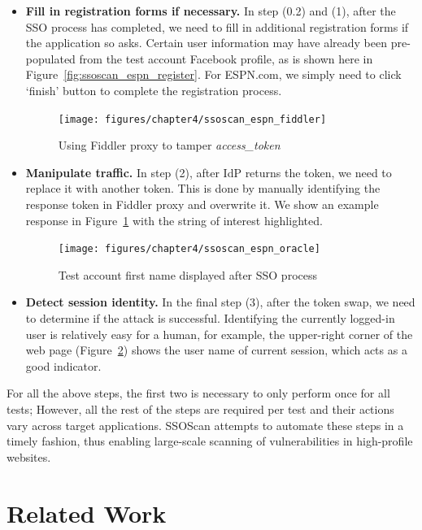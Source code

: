 \begin{itemize}
\item \textbf{Fill in registration forms if necessary.}  In step (0.2) and (1), after the SSO process has completed, we need to fill in additional registration forms if the application so asks.  Certain user information may have already been pre-populated from the test account Facebook profile, as is shown here in Figure~\ref{fig:ssoscan_espn_register}.  For ESPN.com, we simply need to click `finish' button to complete the registration process.

\begin{figure}[bht]
\centering
\texttt{[image: figures/chapter4/ssoscan\_espn\_fiddler]}
\caption{Using Fiddler proxy to tamper \emph{access\_token}}
\label{fig:ssoscan_espn_fiddler}
\end{figure}

\item \textbf{Manipulate traffic.} In step (2), after IdP returns the token, we need to replace it with another token.  This is done by manually identifying the response token in Fiddler proxy and overwrite it.  We show an example response in Figure~\ref{fig:ssoscan_espn_fiddler} with the string of interest highlighted.

\begin{figure}[hbt]
\centering
\texttt{[image: figures/chapter4/ssoscan\_espn\_oracle]}
\caption{Test account first name displayed after SSO process}
\label{fig:ssoscan_espn_oracle}
\end{figure}

\item \textbf{Detect session identity.}  In the final step (3), after the token swap, we need to determine if the attack is successful.  Identifying the currently logged-in user is relatively easy for a human, for example, the upper-right corner of the web page (Figure~\ref{fig:ssoscan_espn_oracle}) shows the user name of current session, which acts as a good indicator.

\end{itemize}

For all the above steps, the first two is necessary to only perform once for all tests;  However, all the rest of the steps are required per test and their actions vary across target applications.  SSOScan attempts to automate these steps in a timely fashion, thus enabling large-scale scanning of vulnerabilities in high-profile websites.  

\section{Related Work}
\label{sec:ssoscan_related_work}

